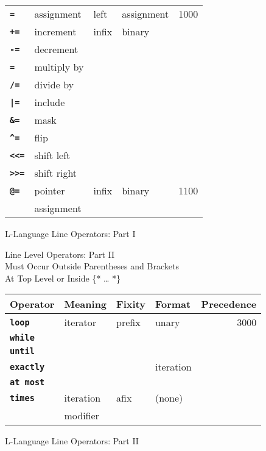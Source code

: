 \documentclass[12pt]{article}
\newcommand{\ttkey}[1]{{\tt \bfseries #1}}
\newlength{\figurewidth}
\newenvironment{boxedfigure}[1][!btp]%
	{\begin{figure*}[#1]
	 \begin{lrbox}{\figurebox}
	 \begin{minipage}{\figurewidth}

	 \vspace*{1ex}}%
	{
	 \vspace*{1ex}

	 \end{minipage}
	 \end{lrbox}

	 \centering
	 \fbox{\hspace*{0.1in}\usebox{\figurebox}\hspace*{0.1in}}
	 \end{figure*}}
\begin{document}
\begin{boxedfigure}[!p]
\begin{center}
\begin{tabular}{|l|l|l|l|r|}
\\\hline
\ttkey{=} & assignment & left & assignment & 1000
\\\cline{1-4}
\ttkey{+=} & increment & infix & binary &
\\\cline{1-2}
\ttkey{-=} & decrement & & &
\\\cline{1-2}
\ttkey{*=} & multiply by & & &
\\\cline{1-2}
\ttkey{/=} & divide by & & &
\\\cline{1-2}
\ttkey{|=} & include & & &
\\\cline{1-2}
\ttkey{\&=} & mask & & &
\\\cline{1-2}
\ttkey{\textasciicircum=} & flip & & &
\\\cline{1-2}
\ttkey{<{}<=} & shift left & & &
\\\cline{1-2}
\ttkey{>{}>=} & shift right & & &
\\\hline
\ttkey{@=} & pointer & infix & binary & 1100 \\
           & assignment & & &
\\\hline
\end{tabular}
\end{center}

\caption{L-Language Line Operators: Part I}
\label{L-LANGUAGE-LINE-OPERATORS-1}
\end{boxedfigure}

\begin{boxedfigure}[!p]
\begin{center}
Line Level Operators: Part II \\
Must Occur Outside Parentheses and Brackets \\
At Top Level or Inside \{* \ldots{} *\}
\\[1ex]
\begin{tabular}{|l|l|l|l|r|}
\hline
Operator & Meaning & Fixity & Format & Precedence \\
\hline
\ttkey{loop} & iterator & prefix & unary & 3000
\\\cline{1-1}
\ttkey{while} &       &        &       &
\\\cline{1-1}
\ttkey{until} &       &        &       &
\\\cline{1-1}\cline{4-4}
\ttkey{exactly} &       &        & iteration       &
\\\cline{1-1}
\ttkey{at most} &       &        &       &
\\\cline{1-4}
\ttkey{times} & iteration & afix   & (none) & \\
               & modifier &        &       &
\\\hline
\end{tabular}
\end{center}

\caption{L-Language Line Operators: Part II}
\label{L-LANGUAGE-LINE-OPERATORS-2}
\end{boxedfigure}
\end{document}
